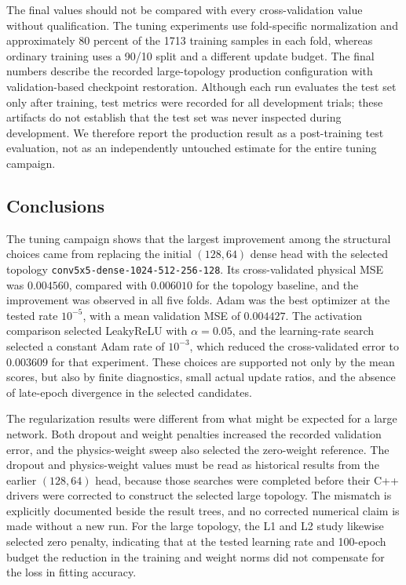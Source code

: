 The final values should not be compared with every cross-validation value without qualification. The tuning experiments use fold-specific normalization and approximately 80 percent of the 1713 training samples in each fold, whereas ordinary training uses a 90/10 split and a different update budget. The final numbers describe the recorded large-topology production configuration with validation-based checkpoint restoration. Although each run evaluates the test set only after training, test metrics were recorded for all development trials; these artifacts do not establish that the test set was never inspected during development. We therefore report the production result as a post-training test evaluation, not as an independently untouched estimate for the entire tuning campaign.\\

\subsection{Conclusions}
\label{sec:04_tuning_conclusions}

The tuning campaign shows that the largest improvement among the structural choices came from replacing the initial $(128,64)$ dense head with the selected topology \texttt{conv5x5-dense-1024-512-256-128}. Its cross-validated physical MSE was $0.004560$, compared with $0.006010$ for the topology baseline, and the improvement was observed in all five folds. Adam was the best optimizer at the tested rate $10^{-5}$, with a mean validation MSE of $0.004427$. The activation comparison selected LeakyReLU with $\alpha=0.05$, and the learning-rate search selected a constant Adam rate of $10^{-3}$, which reduced the cross-validated error to $0.003609$ for that experiment. These choices are supported not only by the mean scores, but also by finite diagnostics, small actual update ratios, and the absence of late-epoch divergence in the selected candidates.

The regularization results were different from what might be expected for a large network. Both dropout and weight penalties increased the recorded validation error, and the physics-weight sweep also selected the zero-weight reference. The dropout and physics-weight values must be read as historical results from the earlier $(128,64)$ head, because those searches were completed before their C++ drivers were corrected to construct the selected large topology. The mismatch is explicitly documented beside the result trees, and no corrected numerical claim is made without a new run. For the large topology, the L1 and L2 study likewise selected zero penalty, indicating that at the tested learning rate and 100-epoch budget the reduction in the training and weight norms did not compensate for the loss in fitting accuracy.

